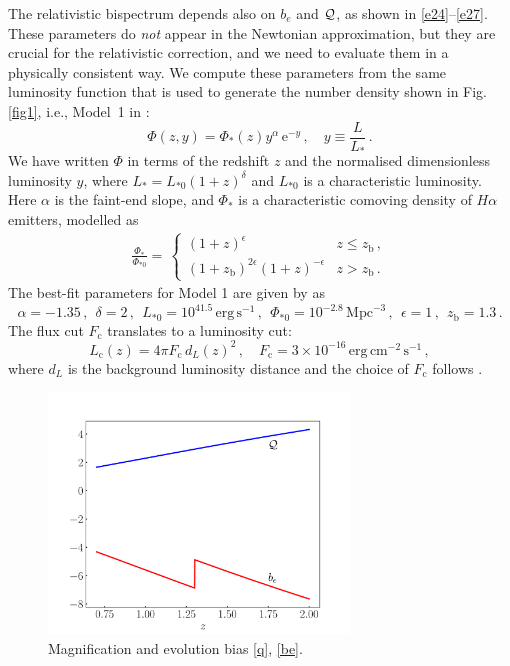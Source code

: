 The relativistic bispectrum depends  also on $b_e$  and ${\cal Q}$, as shown in \eqref{e24}--\eqref{e27}.
These parameters do {\em not} appear in the Newtonian approximation, but they are crucial for the relativistic correction, and we need to evaluate them in a physically consistent way. We compute these parameters from the same luminosity function that is  used to generate the number density shown in Fig. \ref{fig1}, i.e., Model~1 in \cite{Pozzetti:2016cch}:
\begin{equation}
\Phi( z,y) = \Phi_{*}(z) y^\alpha\,{\mathrm{e}}^{-y}\,, \quad y\equiv \frac{L}{L_{*}}\,.
\label{e12_3}
\end{equation}
We have written $\Phi$ in terms of the redshift $z$ and the normalised dimensionless luminosity $y$, where $L_*=L_{*0}(1+z)^\delta$ and $L_{*0}$ is a characteristic luminosity.   Here
 $\alpha$ is the faint-end slope, 
and $\Phi_{*}$ is a characteristic comoving density of $H\alpha$ emitters, modelled as 
\begin{align}
\frac{\Phi_{*}}{\Phi_{*0}}= \,
\begin{cases} (1+z)^{\epsilon} &   z \leq z_{\mathrm{b}}\,,\\
(1+z_{\mathrm{b}})^{2\epsilon}(1+z)^{-\epsilon} & z > z_{\mathrm{b}} \,.
\end{cases}
\end{align}
The best-fit parameters for Model 1 are given by \cite{Pozzetti:2016cch} as 
\begin{equation} \label{eucp}
\alpha=-1.35\,, ~~\delta=2\,,~~ L_{*0}=10^{41.5}\,\mathrm{erg\,s}^{-1}\,,~~\Phi_{*0}=10^{-2.8}\,\mathrm{Mpc}^{-3}\,,~~\epsilon=1\,,~~z_{\mathrm{b}}=1.3  \,. 
\end{equation}
The flux cut  
 $F_{\mathrm{c}}$
 translates to a luminosity cut:
 \begin{equation} \label{lc}
 L_{\mathrm{c}}(z)=4\pi F_{\mathrm{c}} \,d_L(z)^2\,,\quad F_{\mathrm{c}} =3\times10^{-16}\,\mathrm{erg\,cm^{-2}\,s^{-1}} \,,
 \end{equation}
where $d_L$ is the background luminosity distance and the choice of $F_{\mathrm{c}}$ follows \cite{Yankelevich:2018uaz}. 
\begin{figure}[ht]
\centering
\includegraphics[width=8.0cm]{fig/beQ-eps-converted-to}
\caption{Magnification and evolution bias \eqref{q}, \eqref{be}.} 
\label{fig2}
\end{figure}

